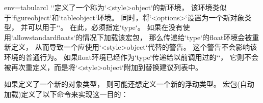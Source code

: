 \begin{tableobject}{env=tabular}{cl}
\DescribeMacro{\NewObjectStyle}
``定义了一个称为`<style>object`的新环境，
该环境类似于`figureobject`和`tableobject`环境。
同时，将`<options>`设置为一个新对象类型，
并可以用于``。
在此，必须指定`type`。
如果在没有使用`allowstandardfloats`的情况下加载该宏包，
那么传递给`type`的float环境会被重新定义，
从而导致一个应使用`<style>object`代替的警告。
这个警告不会影响该环境的普通行为。
如果float环境已经作为`type`传递给以前调用过的`\NewObjectStyle`，
它则不会被再次重定义，而是将`<style>object`附加到替换建议列表中。

如果定义了一个新的对象类型，
则可能还想定义一个新的浮动类型。
宏包(自动加载)定义了以下命令来实现这一目的：


\end{tableobject}
